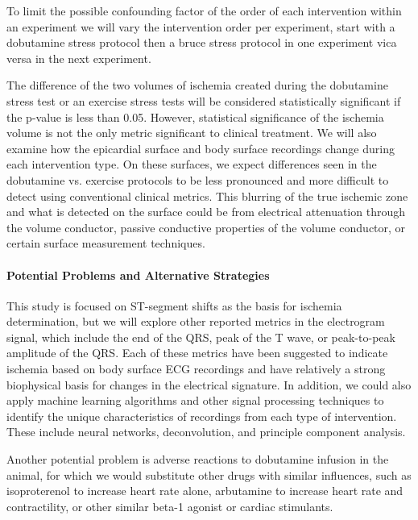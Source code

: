 To limit the possible confounding factor of the order of each intervention within an experiment we will vary the intervention order per experiment, \ie{} start with a dobutamine stress protocol then a bruce stress protocol in one experiment vica versa in the next experiment. 


The difference of the two volumes of ischemia created during the dobutamine stress test or an exercise stress tests will be considered statistically significant if the p-value is less than 0.05. However, statistical significance of the ischemia volume is not the only metric significant to clinical treatment. We will also examine how the epicardial surface and body surface recordings change during each intervention type. On these surfaces, we expect differences seen in the dobutamine vs. exercise protocols to be less pronounced and more difficult to detect using conventional clinical metrics. This blurring of the true ischemic zone and what is detected on the surface could be from electrical attenuation through the volume conductor, passive conductive properties of the volume conductor, or certain surface measurement techniques. 



\paragraph{Potential Problems and Alternative Strategies} This study is
focused on ST-segment shifts as the basis for ischemia determination, but
we will explore other reported metrics in the electrogram signal, which
include the end of the QRS, peak of the T wave, or peak-to-peak amplitude
of the QRS. Each of these metrics have been suggested to indicate ischemia based on body surface ECG recordings and have relatively a strong biophysical basis for changes in the electrical signature. In addition, we could also apply machine learning algorithms and other signal processing techniques to identify the unique characteristics of recordings from each type of intervention. These include neural networks, deconvolution, and principle component analysis. 

Another potential problem is adverse reactions to dobutamine
infusion in the animal, for which we would substitute other drugs with
similar influences, such as isoproterenol to increase heart rate alone,
arbutamine to increase heart rate and contractility, or other similar
beta-1 agonist or cardiac stimulants. 




